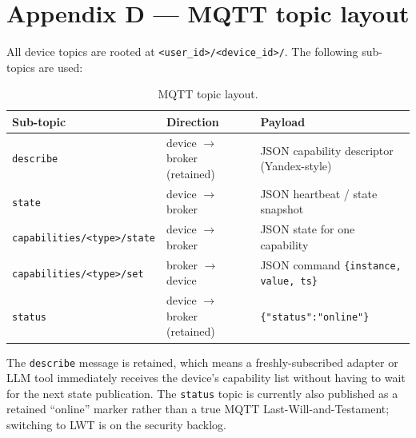 \documentclass[a4paper,12pt]{article}
\begin{document}
\newpage

\section*{Appendix D --- MQTT topic layout}

All device topics are rooted at \verb|<user_id>/<device_id>/|. The following sub-topics are used:

\begin{table}[h]
\centering
\small
\begin{tabularx}{\textwidth}{llX}
\toprule
\textbf{Sub-topic} & \textbf{Direction} & \textbf{Payload} \\
\midrule
\verb|describe| & device $\to$ broker (retained) & JSON capability descriptor (Yandex-style) \\
\verb|state|    & device $\to$ broker            & JSON heartbeat / state snapshot \\
\verb|capabilities/<type>/state| & device $\to$ broker & JSON state for one capability \\
\verb|capabilities/<type>/set|   & broker $\to$ device & JSON command \verb|{instance, value, ts}| \\
\verb|status|   & device $\to$ broker (retained) & \verb|{"status":"online"}| \\
\bottomrule
\end{tabularx}
\caption{MQTT topic layout.}
\label{tab:mqtt}
\end{table}

The \verb|describe| message is retained, which means a freshly-subscribed adapter or LLM tool immediately receives the device's capability list without having to wait for the next state publication. The \verb|status| topic is currently also published as a retained ``online'' marker rather than a true MQTT Last-Will-and-Testament; switching to LWT is on the security backlog.
\end{document}
